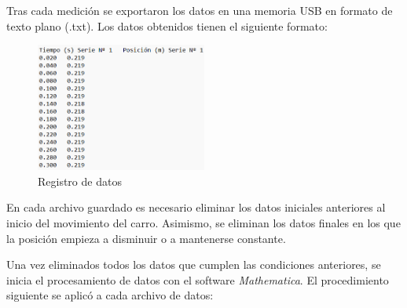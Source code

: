 \documentclass[12pt, titlepage]{report}
\begin{document}
    Tras cada medición se exportaron los datos en una memoria USB en formato de texto plano (.txt). Los datos obtenidos tienen el siguiente formato:

    \begin{figure}[ht]
        \centering
        \includegraphics[width=0.5\textwidth]{Formato_Datos.png}
        \caption{Registro de datos}
    \end{figure}
    
    En cada archivo guardado es necesario eliminar los datos iniciales anteriores al inicio del movimiento del carro. Asimismo, se eliminan los datos finales en los que la posición empieza a disminuir o a mantenerse constante.
    
    Una vez eliminados todos los datos que cumplen las condiciones anteriores, se inicia el procesamiento de datos con el software \textit{Mathematica}. El procedimiento siguiente se aplicó a cada archivo de datos:
    
\end{document}
